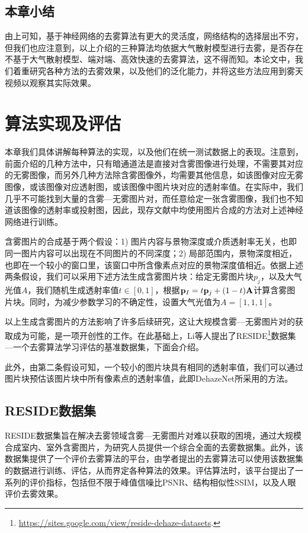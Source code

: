 \documentclass[a4paper, 12pt, oneside]{report}
\begin{document}
{\section{本章小结\quad}
	由上可知，基于神经网络的去雾算法有更大的灵活度，网络结构的选择层出不穷，但我们也应注意到，以上介绍的三种算法均依据大气散射模型进行去雾，是否存在不基于大气散射模型、端对端、高效快速的去雾算法，这不得而知。本论文中，我们着重研究各种方法的去雾效果，以及他们的泛化能力，并将这些方法应用到雾天视频以观察其实际效果。

\chapter{算法实现及评估\quad}

本章我们具体讲解每种算法的实现，以及他们在统一测试数据上的表现。注意到，前面介绍的几种方法中，只有暗通道法是直接对含雾图像进行处理，不需要其对应的无雾图像，而另外几种方法除含雾图像外，均需要其他信息，如该图像对应无雾图像，或该图像对应透射图，或该图像中图片块对应的透射率值。在实际中，我们几乎不可能找到大量的含雾—无雾图片对，而任意给定一张含雾图像，我们也不知道该图像的透射率或投射图，因此，现存文献中均使用图片合成的方法对上述神经网络进行训练。

含雾图片的合成基于两个假设\cite{ref20}：1) 图片内容与景物深度或介质透射率无关，也即同一图片内容可以出现在不同图片的不同深度；2) 局部范围内，景物深度相近，也即在一个较小的窗口里，该窗口中所含像素点对应的景物深度值相近。依据上述两条假设，我们可以采用下述方法生成含雾图片块：给定无雾图片块$p_j$，以及大气光值$A$，我们随机生成透射率值$t\in [0,1]$，根据${\bf p}_I = t{\bf p}_j + (1 - t){\bf A}$计算含雾图片块。同时，为减少参数学习的不确定性，设置大气光值为$A = [1,1,1]$。

以上生成含雾图片的方法影响了许多后续研究，这让大规模含雾—无雾图片对的获取成为可能，是一项开创性的工作。在此基础上，Li\cite{ref21}等人提出了RESIDE\footnote{\url{https://sites.google.com/view/reside-dehaze-datasets}.}数据集—一个去雾算法学习评估的基准数据集，下面会介绍。

此外，由第二条假设可知，一个较小的图片块具有相同的透射率值，我们可以通过图片块预估该图片块中所有像素点的透射率值，此即DehazeNet所采用的方法。

\section{RESIDE数据集\quad}
RESIDE数据集旨在解决去雾领域含雾—无雾图片对难以获取的困境，通过大规模合成室内、室外含雾图片，为研究人员提供一个综合全面的去雾数据集。此外，该数据集提供了一个评价去雾算法的平台，由学者提出的去雾算法可以使用该数据集的数据进行训练、评估，从而界定各种算法的效果。评估算法时，该平台提出了一系列的评价指标，包括但不限于峰值信噪比PSNR、结构相似性SSIM，以及人眼评价去雾效果。

}
\end{document}
